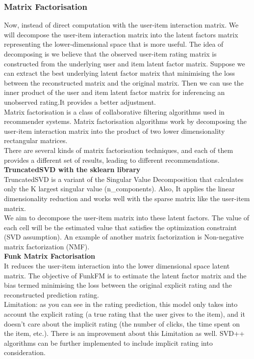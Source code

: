 \subsubsection{Matrix Factorisation}
\label{MatrixFac}
Now, instead of direct computation with the user-item interaction matrix. We will decompose the user-item interaction matrix into the latent factors matrix representing the lower-dimensional space that is more useful. The idea of decomposing is we believe that the observed user-item rating matrix is constructed from the underlying user and item latent factor matrix. Suppose we can extract the best underlying latent factor matrix that minimising the loss between the reconstructed matrix and the original matrix. Then we can use the inner product of the user and item latent factor matrix for inferencing an unobserved rating.It provides a better  adjustment.
\\Matrix factorisation is a class of collaborative filtering algorithms used in recommender systems. Matrix factorisation algorithms work by decomposing the user-item interaction matrix into the product of two lower dimensionality rectangular matrices.
\\There are several kinds of matrix factorisation techniques, and each of them provides a different set of results, leading to different recommendations.
\\ \textbf{TruncatedSVD with the sklearn library}
\\TruncatedSVD is a variant of the Singular Value Decomposition that calculates only the K largest singular value (n\_components). Also, It applies the linear dimensionality reduction and works well with the sparse matrix like the user-item matrix.
\\We aim to decompose the user-item matrix into these latent factors. The value of each cell will be the estimated value that satisfies the optimization constraint (SVD assumption). An example of another matrix factorization is Non-negative matrix factorization (NMF).
\\ \textbf{Funk Matrix Factorisation}
\\It reduces the user-item interaction into the lower dimensional space latent matrix. The objective of FunkFM is to estimate the latent factor matrix and the bias termed minimising the loss between the original explicit rating and the reconstructed prediction rating.
\\ Limitation: as you can see in the rating prediction, this model only takes into account the explicit rating (a true rating that the user gives to the item), and it doesn't care about the implicit rating (the number of clicks, the time spent on the item, etc.). There is an improvement about this Limitation as well. SVD++ algorithms can be further implemented to include implicit rating into consideration.
